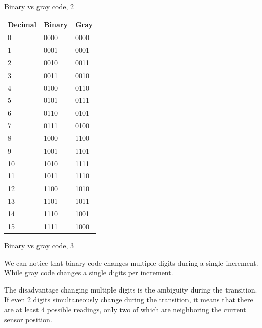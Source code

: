 \documentclass{beamer}
\begin{document}
\begin{frame}{Binary vs gray code, 2}
	\begin{flushleft}
		
		\begin{table}[]
			\begin{tabular}{lll}
				\textbf{Decimal} & \textbf{Binary} & \textbf{Gray} \\
				0       & 0000   & 0000 \\
				1       & 0001   & 0001 \\
				2       & 0010   & 0011 \\
				3       & 0011   & 0010 \\
				4       & 0100   & 0110 \\
				5       & 0101   & 0111 \\
				6       & 0110   & 0101 \\
				7       & 0111   & 0100 \\
				8       & 1000   & 1100 \\
				9       & 1001   & 1101 \\
				10      & 1010   & 1111 \\
				11      & 1011   & 1110 \\
				12      & 1100   & 1010 \\
				13      & 1101   & 1011 \\
				14      & 1110   & 1001 \\
				15      & 1111   & 1000
			\end{tabular}
		\end{table}
		
	\end{flushleft}
\end{frame}


\begin{frame}{Binary vs gray code, 3}
	\begin{flushleft}
		
		We can notice that binary code changes multiple digits during a single increment. While gray code changes a single digits per increment.
		
		\bigskip
		
		The disadvantage changing multiple digits is the ambiguity during the transition. If even 2 digits simultaneously change during the transition, it means that there are at least 4 possible readings, only two of which are neighboring the current sensor position.
		
	\end{flushleft}
\end{frame}
\end{document}
